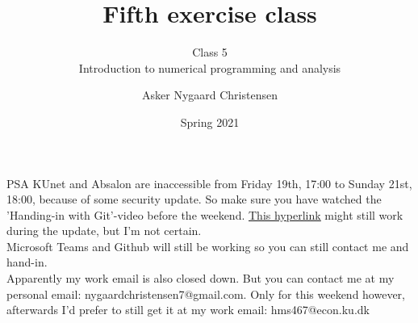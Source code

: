 \documentclass[10pt,danish,t,10pt]{beamer}
\title{Fifth exercise class \vspace{-2mm}}
\subtitle{Class 5 \\Introduction to numerical programming and analysis \vspace{-4mm} }
\author{Asker Nygaard Christensen}
\date{Spring 2021}
\begin{document}
{
\begin{frame}

\maketitle


\end{frame}
}

\addtocounter{framenumber}{-1}

\begin{frame}{PSA}
    KUnet and Absalon are inaccessible from Friday 19th, 17:00 to Sunday 21st, 18:00, because of some security update. \newline
    So make sure you have watched the 'Handing-in with Git'-video before the weekend. \href{https://dchsou11xk84p.cloudfront.net/html5/html5lib/v2.80/mwEmbedFrame.php/p/343/uiconf_id/23452573/entry_id/0_z3o0q5lk?wid=_343&iframeembed=true&playerId=kaltura_player&entry_id=0_z3o0q5lk&flashvars[streamerType]=auto&amp;flashvars[localizationCode]=en&amp;flashvars[leadWithHTML5]=true&amp;flashvars[sideBarContainer.plugin]=true&amp;flashvars[sideBarContainer.position]=left&amp;flashvars[sideBarContainer.clickToClose]=true&amp;flashvars[chapters.plugin]=true&amp;flashvars[chapters.layout]=vertical&amp;flashvars[chapters.thumbnailRotator]=false&amp;flashvars[streamSelector.plugin]=true&amp;flashvars[EmbedPlayer.SpinnerTarget]=videoHolder&amp;flashvars[dualScreen.plugin]=true&amp;flashvars[Kaltura.addCrossoriginToIframe]=true&amp;&wid=0_yzpoyodt}{\underline{This hyperlink}} might still work during the update, but I'm not certain.\\
    Microsoft Teams and Github will still be working so you can still contact me and hand-in. \\ 
    Apparently my work email is also closed down. But you can contact me at my personal email:  nygaardchristensen7@gmail.com. Only for this weekend however, afterwards I'd prefer to still get it at my work email: hms467@econ.ku.dk
\end{frame}
\end{document}
